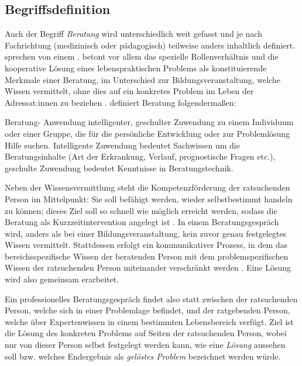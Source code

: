 \documentclass[
  twoside,
  parskip=half-,
]{scrreprt}
\begin{document}
\subsection{Begriffsdefinition}
Auch der Begriff \textit{Beratung} wird unterschiedlich weit gefasst und je nach Fachrichtung (medizinisch oder pädagogisch) teilweise anders inhaltlich definiert. \citeauthor{hacker2021} sprechen von einem . \citeauthor{dinkelaker} betont vor allem das spezielle Rollenverhältnis und die kooperative Lösung eines lebenspraktischen Problems als konstituierende Merkmale einer Beratung, im Unterschied zur Bildungsveranstaltung, welche Wissen vermittelt, ohne dies auf ein konkretes Problem im Leben der Adressat:innen zu beziehen \autocite[178f.]{dinkelaker}. \citeauthor{integrativePsycho} definiert Beratung folgendermaßen:
\begin{displayquote}
  Beratung- Anwendung intelligenter, geschulter Zuwendung zu einem Individuum oder einer Gruppe, die für die persönliche Entwicklung oder zur Problemlösung Hilfe suchen. Intelligente Zuwendung bedeutet Sachwissen um die Beratungsinhalte (Art der Erkrankung, Verlauf, prognostische Fragen etc.), geschulte Zuwendung bedeutet Kenntnisse in Beratungstechnik.
\end{displayquote}
Neben der Wissensvermittlung steht die Kompetenzförderung der ratsuchenden Person im Mittelpunkt: Sie soll befähigt werden, wieder selbstbestimmt handeln zu können; dieses Ziel soll so schnell wie möglich erreicht werden, sodass die Beratung als Kurzzeitintervention angelegt ist \autocite[vgl.][]{BZGABeratungEdukation}. In einem Beratungsgespräch wird, anders als bei einer Bildungsveranstaltung, kein zuvor genau festgelegtes Wissen vermittelt. Stattdessen erfolgt ein kommunikativer Prozess, in dem das bereichsspezifische Wissen der beratenden Person mit dem problemspezifischen Wissen der ratsuchenden Person miteinander verschränkt werden \autocite[vgl.][178]{dinkelaker}. Eine Lösung wird also gemeinsam erarbeitet. 

Ein professionelles Beratungsgespräch findet also statt zwischen der ratsuchenden Person, welche sich in einer Problemlage befindet, und der ratgebenden Person, welche über Expertenwissen in einem bestimmten Lebensbereich verfügt. Ziel ist die Lösung des konkreten Problems auf Seiten der ratsuchenden Person, wobei nur von dieser Person selbst festgelegt werden kann, wie eine \textit{Lösung} aussehen soll bzw. welches Endergebnis als \textit{gelöstes Problem} bezeichnet werden würde. 
\end{document}

